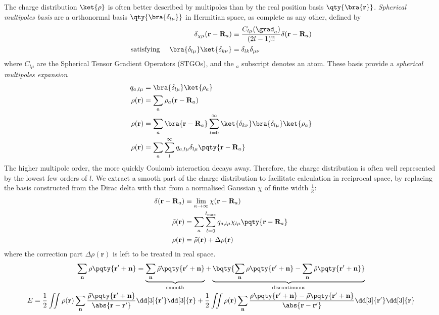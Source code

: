 \documentclass[12pt]{extarticle}
\renewcommand{\bf}{\mathbf}
\begin{document}
    The charge distribution \(\ket{\rho} \) is often better described by multipoles than by the real position basis \(\qty{\bra{\bf r}}\). \textit{Spherical multipoles basis} are a orthonormal basis \(\qty{\bra{\delta_{l\mu}}}\) in Hermitian space, as complete as any other, defined by \begin{align*}
        \delta_{\chi \mu } (\bf r - \bf R_a) &\equiv \frac{C_{l \mu} (\grad_a)}{(2l - 1)!!} \delta (\bf r - \bf R_a)\\
        \text{satisfying }\quad\bra{\delta_{l\mu}} \ket{\delta_{k\nu}} &= \delta_{lk} \delta_{\mu \nu}
    \end{align*}
    where \(C_{l \mu}\) are the Spherical Tensor Gradient Operators (STGOs), and the \({}_a\) subscript denotes an atom. These basis provide a \textit{spherical multipoles expansion}
    \begin{align*}
        q_{a, l\mu} &= \bra{\delta_{l\mu}} \ket{\rho_a}  \\
        \rho (\bf r) &= \sum_{a} \rho_a (\bf r - \bf R_a)\\
        \rho (\bf r) &= \sum_{a} \bra{\bf r - \bf R_a} \sum_{l =0}^\infty \ket{\delta_{k\nu}} \bra{\delta_{l\mu}}\ket{\rho_a} \\
        \rho (\bf r) &= \sum_{a} \sum_l^\infty q_{a, l \mu} \delta_{l \mu} \pqty{\bf r - \bf R_a}
    \end{align*}
    The higher multipole order, the more quickly Coulomb interaction decays away. Therefore, the charge distribution is often well represented by the lowest few orders of \(l\). We extract a smooth part of the charge distribution to facilitate calculation in reciprocal space, by replacing the basis constructed from the Dirac delta with that from a normalised Gaussian \(\chi\) of finite width \(\frac{1}{\kappa}\):
    \begin{align*}
        \delta ( \bf r - \bf R_a) &\equiv \lim_{\kappa \to  \infty} \chi (\bf r - \bf R_a)\\
        \tilde{\rho} ( \bf r) &=  \sum_{a} \sum_{l = 0}^{l_{\max}} q_{a, l \mu} \chi_{l \mu} \pqty{\bf r - \bf R_a}\\
        \rho (\bf r) &= \tilde{\rho} ( \bf r) + \Delta \rho(\bf r)
    \end{align*}
    where the correction part \(\Delta \rho (\bf r)\) is left to be treated in real space. 
    \begin{gather*}
        \sum_{\bf n} \rho \pqty{ \bf r' + \bf n} = \underbrace{\sum_{\bf n} \tilde{\rho} \pqty{ \bf r' + \bf n}}_\text{smooth} + \underbrace{\bqty{\sum_{\bf n} \rho \pqty{ \bf r' + \bf n} - \sum_{\bf n} \tilde{\rho} \pqty{ \bf r' + \bf n}}}_ \text{discontinuous}\\
        E = \frac{1}{2} \iint \rho(\bf r) \sum_{\bf n} \frac{\tilde{\rho} \pqty{ \bf r' + \bf n}}{\abs{\bf r - \bf r'}} \dd[3]{\bf r'} \dd[3]{\bf r} + \frac{1}{2} \iint \rho(\bf r) \sum_{\bf n} \frac{ \rho \pqty{ \bf r' + \bf n} - \tilde{\rho} \pqty{ \bf r' + \bf n}}{\abs{\bf r - \bf r'}} \dd[3]{\bf r'} \dd[3]{\bf r}
    \end{gather*}
    
\end{document}
